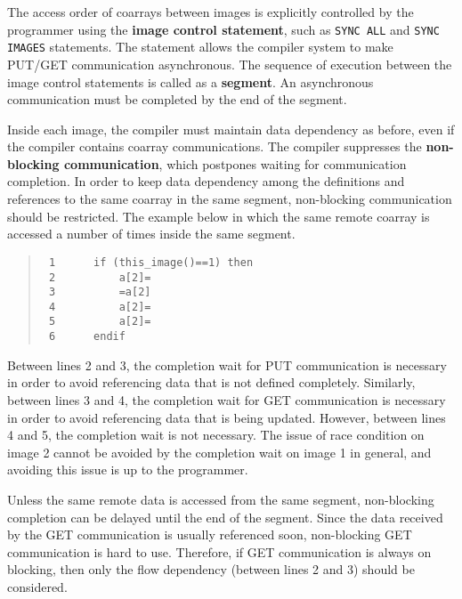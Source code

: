 The access order of coarrays between images is explicitly controlled by the 
programmer using the {\bf image control statement}, 
such as {\tt SYNC ALL} and {\tt SYNC IMAGES} statements. 
The statement allows the compiler system to make PUT/GET communication asynchronous.
The sequence of execution between the image control statements is called as a {\bf segment}.
An asynchronous communication must be completed by the end of the segment.

Inside each image, the compiler must maintain data dependency 
as before, even if the compiler contains coarray communications.
The compiler suppresses the {\bf non-blocking communication},
which postpones waiting for communication completion.
In order to keep data dependency among the definitions and references to the same 
coarray in the same segment, non-blocking communication should be restricted.
The example below in which the same remote coarray is accessed a number of times inside the same segment.
\begin{quote}
\begin{verbatim}
 1      if (this_image()==1) then
 2          a[2]=
 3          =a[2]
 4          a[2]=
 5          a[2]=
 6      endif
\end{verbatim}
\end{quote}
Between lines 2 and 3, the completion wait for PUT communication is necessary in order
to avoid referencing data that is not defined completely.
Similarly, between lines 3 and 4, the completion wait for GET communication is 
necessary in order to avoid referencing data that is being updated.
However, between lines 4 and 5, the completion wait is not necessary.
The issue of race condition on image 2 cannot be avoided by the completion wait
on image 1 in general, and avoiding this issue is up to the programmer.

\requirement
Unless the same remote data is accessed from the same segment, 
non-blocking completion can be delayed until the end of the segment.
Since the data received by the GET communication is usually referenced soon, 
non-blocking GET communication is hard to use. Therefore, if GET communication is
always on blocking, then only the flow dependency (between lines 2 and 3) should be considered.


